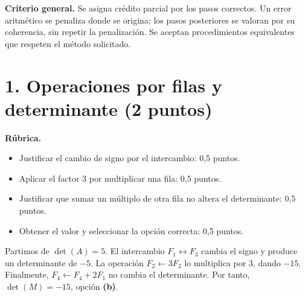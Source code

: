 \documentclass[10pt,a4]{examenEPN0}
\begin{document}
\encabezado
\noindent\textbf{Criterio general.} Se asigna crédito parcial por los pasos
correctos. Un error aritmético se penaliza donde se origina; los pasos
posteriores se valoran por su coherencia, sin repetir la penalización.
Se aceptan procedimientos equivalentes que respeten el método solicitado.

\section*{1. Operaciones por filas y determinante (2 puntos)}
\noindent\textbf{Rúbrica.}
\begin{itemize}[itemsep=2pt]
    \item Justificar el cambio de signo por el intercambio: 0,5 puntos.
    \item Aplicar el factor 3 por multiplicar una fila: 0,5 puntos.
    \item Justificar que sumar un múltiplo de otra fila no altera el determinante: 0,5 puntos.
    \item Obtener el valor y seleccionar la opción correcta: 0,5 puntos.
\end{itemize}
Partimos de $\det(A)=5$. El intercambio $F_1\leftrightarrow F_3$
cambia el signo y produce un determinante de $-5$. La operación
$F_2\leftarrow3F_2$ lo multiplica por 3, dando $-15$.
Finalmente, $F_4\leftarrow F_4+2F_1$ no cambia el determinante.
Por tanto, $\boxed{\det(M)=-15}$, opción \textbf{(b)}.
\end{document}
